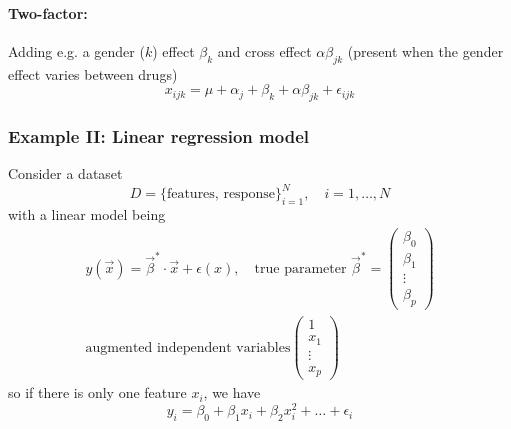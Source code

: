 \paragraph*{Two-factor:} Adding e.g. a gender ($k$) effect $\beta_k$ and cross effect $\alpha \beta_{jk}$ (present
when the gender effect varies between drugs)
\begin{equation}
    x_{ijk} = \mu + \alpha_j + \beta_k + \alpha \beta_{jk} + \epsilon_{ijk}
\end{equation}

\subsubsection{Example II: Linear regression model}
Consider a dataset
\begin{equation}
    D = \{\text{features, response}\}_{i=1}^N, \quad i = 1,\dots,N
\end{equation}
with a linear model being
\begin{equation}
    \begin{gathered}    
        y(\vec{x}) = \vec{\beta}^* \cdot \vec{x} + \epsilon(x), \quad \text{true parameter } \vec{\beta}^* = \left( \begin{array}{c} \beta_0 \\ \beta_1 \\ \vdots \\ \beta_p \end{array} \right) \\
        \text{augmented independent variables} \left( \begin{array}{c} 1 \\ x_1 \\ \vdots \\ x_p \end{array} \right)
    \end{gathered}
\end{equation}
so if there is only one feature $x_i$, we have
\begin{equation}
    y_i = \beta_0 + \beta_1 x_i + \beta_2 x_i^2 + \dots + \epsilon_i
\end{equation}


